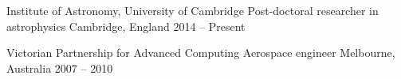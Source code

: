 
\begin{cventries}
  \cventry
    {Institute of Astronomy, University of Cambridge}
    {Post-doctoral researcher in astrophysics}
    {Cambridge, England}
    {2014 -- Present}
    {}

  \cventry
    {Victorian Partnership for Advanced Computing}
    {Aerospace engineer}
    {Melbourne, Australia}
    {2007 -- 2010}
	{}
	
\end{cventries}
